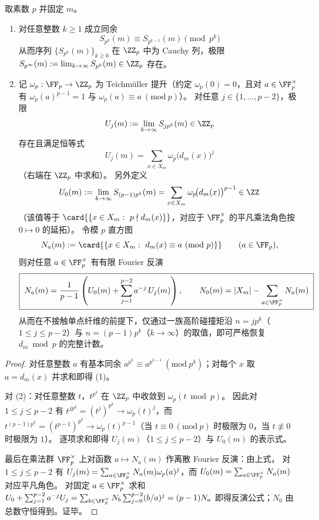 \begin{proposition}\label{prop:pom-collision-moment-ptypical-congruence-teichmuller-histogram}
取素数 \(p\) 并固定 \(m\)。
\begin{enumerate}
  \item 对任意整数 \(k\ge 1\) 成立同余
  \[
  \boxed{\;
  S_{p^k}(m)\equiv S_{p^{k-1}}(m)\pmod{p^k}\;}
  \]
  从而序列 \(\{S_{p^k}(m)\}_{k\ge 0}\) 在 \(\ZZ_p\) 中为 Cauchy 列，极限
  \(
  S_{p^\infty}(m):=\lim_{k\to\infty}S_{p^k}(m)\in\ZZ_p
  \)
  存在。
  \item 记 \(\omega_p:\FF_p\to\ZZ_p\) 为 Teichm\"uller 提升（约定 \(\omega_p(0)=0\)，且对 \(a\in\FF_p^\times\) 有 \(\omega_p(a)^{p-1}=1\) 与 \(\omega_p(a)\equiv a\ (\mathrm{mod}\ p)\)）。
  对任意 \(j\in\{1,\dots,p-2\}\)，极限
  \[
  U_j(m):=\lim_{k\to\infty}S_{j p^k}(m)\in\ZZ_p
  \]
  存在且满足恒等式
  \[
  \boxed{\;
  U_j(m)=\sum_{x\in X_m}\omega_p\!\bigl(d_m(x)\bigr)^j\;}
  \]
  （右端在 \(\ZZ_p\) 中求和）。
  另外定义
  \[
  U_0(m):=\lim_{k\to\infty}S_{(p-1)p^k}(m)=\sum_{x\in X_m}\omega_p\!\bigl(d_m(x)\bigr)^{p-1}\in\ZZ
  \]
  （该值等于 \(\card{\{x\in X_m:\ p\nmid d_m(x)\}}\)，对应于 \(\FF_p^\times\) 的平凡乘法角色按 \(0\mapsto 0\) 的延拓）。
  令模 \(p\) 直方图
  \[
  N_a(m):=\card{\{x\in X_m:\ d_m(x)\equiv a\ (\mathrm{mod}\ p)\}}\qquad(a\in\FF_p),
  \]
  则对任意 \(a\in\FF_p^\times\) 有有限 Fourier 反演
  \[
  \boxed{\;
  N_a(m)=\frac{1}{p-1}\left(U_0(m)+\sum_{j=1}^{p-2}a^{-j}\,U_j(m)\right),\qquad
  N_0(m)=|X_m|-\sum_{a\in\FF_p^\times}N_a(m)\;}
  \]
  从而在不接触单点纤维的前提下，仅通过一族高阶碰撞矩沿 \(n=j p^k\)（\(1\le j\le p-2\)）与 \(n=(p-1)p^k\)（\(k\to\infty\)）的取值，即可严格恢复 \(d_m\bmod p\) 的完整计数。
\end{enumerate}
\end{proposition}
\begin{proof}
对任意整数 \(a\) 有基本同余 \(a^{p^k}\equiv a^{p^{k-1}}\ (\mathrm{mod}\ p^k)\)；对每个 \(x\) 取 \(a=d_m(x)\) 并求和即得 (1)。
\par
对 (2)：对任意整数 \(t\)，\(t^{p^k}\) 在 \(\ZZ_p\) 中收敛到 \(\omega_p(t\bmod p)\)。
因此对 \(1\le j\le p-2\) 有 \(t^{j p^k}=(t^j)^{p^k}\to \omega_p(t)^j\)，而
\(
t^{(p-1)p^k}=(t^{p-1})^{p^k}\to \omega_p(t)^{p-1}
\)（当 \(t\equiv 0\ (\mathrm{mod}\ p)\) 时极限为 \(0\)，当 \(t\not\equiv 0\) 时极限为 \(1\)）。
逐项求和即得 \(U_j(m)\)（\(1\le j\le p-2\)）与 \(U_0(m)\) 的表示式。
\par
最后在乘法群 \(\FF_p^\times\) 上对函数 \(a\mapsto N_a(m)\) 作离散 Fourier 反演：由上式，
对 \(1\le j\le p-2\) 有
\(
U_j(m)=\sum_{a\in\FF_p^\times}N_a(m)\omega_p(a)^j
\)，而 \(U_0(m)=\sum_{a\in\FF_p^\times}N_a(m)\) 对应平凡角色。
对固定 \(a\in\FF_p^\times\) 求和
\(
U_0+\sum_{j=1}^{p-2}a^{-j}U_j
=\sum_{b\in\FF_p^\times}N_b\sum_{j=0}^{p-2}(b/a)^j
=(p-1)N_a
\)
即得反演公式；\(N_0\) 由总数守恒得到。证毕。
\end{proof}

